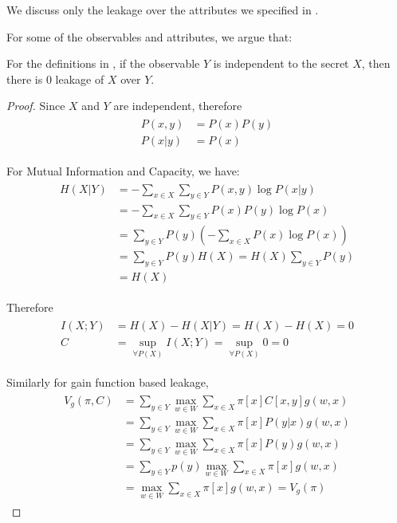 We discuss only the leakage over the attributes we specified in .

For some of the observables and attributes, we argue that:

\begin{theorem} \label{Te: IR}
For the definitions in , if the observable $Y$ is independent to the secret $X$, then there is $0$ leakage of $X$ over $Y$.
\end{theorem}

\begin{proof}
	Since $X$ and $Y$ are independent, therefore
	\begin{eqnarray*}
		\begin{aligned}
			P(x,y) &= P(x)P(y) \\
			P(x|y) &= P(x)
		\end{aligned}
	\end{eqnarray*}

	For Mutual Information and Capacity, we have:
	\begin{eqnarray*}
		\begin{aligned}
			H(X|Y) 
			&= - \sum_{x \in X} \sum_{y \in Y} P(x,y)\log{P(x|y)} \\
			&= - \sum_{x \in X} \sum_{y \in Y} P(x)P(y)\log{P(x)} \\
			&= \sum_{y \in Y} P(y) (- \sum_{x \in X}P(x)\log{P(x)}) \\
			&= \sum_{y \in Y} P(y) H(X) = H(X) \sum_{y \in Y}{P(y)} \\
			&= H(X)
		\end{aligned}
	\end{eqnarray*}
	
	Therefore
	\begin{eqnarray*}
		\begin{aligned}
			I(X;Y) &= H(X) - H(X|Y) = H(X) - H(X) = 0 \\
			C &= \sup_{\forall P(X)} I(X;Y) = \sup_{\forall P(X)} 0 = 0
		\end{aligned}
	\end{eqnarray*}
	
	Similarly for gain function based leakage\cite{GLeakage},
	\begin{eqnarray*}
		\begin{aligned}
			V_{g}(\pi, C) 
			&= \sum_{y \in Y}{\max_{w \in W}\sum_{x \in X}{\pi[x]C[x,y]g(w,x)}} \\
			&= \sum_{y \in Y}{\max_{w \in W}\sum_{x \in X}{\pi[x]P(y|x)g(w,x)}} \\
			&= \sum_{y \in Y}{\max_{w \in W}\sum_{x \in X}{\pi[x]P(y)g(w,x)}} \\
			&= \sum_{y \in Y}p(y){\max_{w \in W}\sum_{x \in X}{\pi[x]g(w,x)}} \\
			&= \max_{w \in W}\sum_{x \in X}{\pi[x]g(w,x)} = V_{g}(\pi)
		\end{aligned}
	\end{eqnarray*}
	

\end{proof}

